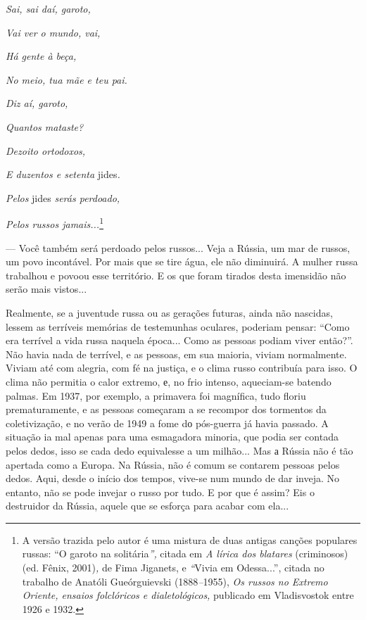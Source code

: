 \emph{Sai, sai daí, garoto, }

\emph{Vai ver o mundo, vai,}

\emph{Há gente à beça, }

\emph{No meio, tua mãe e teu pai.}

\emph{Diz aí, garoto, }

\emph{Quantos mataste?}

\emph{Dezoito ortodoxos, }

\emph{E duzentos e setenta} jides\emph{.}

\emph{Pelos} jides \emph{serás perdoado, }

\emph{Pelos russos jamais...}\footnote{A versão trazida pelo autor é uma
  mistura de duas antigas canções populares russas: ``O garoto na
  solitária\emph{'',} citada em \emph{A lírica dos blatares}
  (criminosos) (ed. Fênix, 2001)\emph{,} de Fima Jiganets, e
  \emph{``}Vivia em Odessa...'', citada no trabalho de Anatóli
  Gueórguievski (1888\emph{--}1955), \emph{Os russos no Extremo Oriente,
  ensaios folclóricos e dialetológicos,} publicado em Vladisvostok entre
  1926 e 1932.}

--- Você também será perdoado pelos russos... Veja a Rússia, um mar de
russos, um povo incontável. Por mais que se tire água, ele não
diminuirá. A mulher russa trabalhou e povoou esse território. E os que
foram tirados desta imensidão não serão mais vistos...

Realmente, se a juventude russa ou as gerações futuras, ainda não
nascidas, lessem as terríveis memórias de testemunhas oculares, poderiam
pensar: ``Como era terrível a vida russa naquela época... Como as
pessoas podiam viver então?''. Não havia nada de terrível, e as pessoas,
em sua maioria, viviam normalmente. Viviam até com alegria, com fé na
justiça, e o clima russo contribuía para isso. O clima não permitia o
calor extremo, е, no frio intenso, aqueciam-se batendo palmas. Em 1937,
por exemplo, a primavera foi magnífica, tudo floriu prematuramente, e as
pessoas começaram a se recompor dos tormentos da coletivização, e no
verão de 1949 a fome dо pós-guerra já havia passado. A situação ia mal
apenas para uma esmagadora minoria, que podia ser contada pelos dedos,
isso se cada dedo equivalesse a um milhão... Mas а Rússia não é tão
apertada como a Europa. Na Rússia, não é comum se contarem pessoas pelos
dedos. Aqui, desde o início dos tempos, vive-se num mundo de dar inveja.
No entanto, não se pode invejar o russo por tudo. E por que é assim? Eis
o destruidor da Rússia, aquele que se esforça para acabar com ela...

